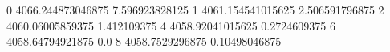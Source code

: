 0 4066.244873046875 7.596923828125
1 4061.154541015625 2.506591796875
2 4060.06005859375 1.412109375
4 4058.92041015625 0.2724609375
6 4058.64794921875 0.0
8 4058.7529296875 0.10498046875
